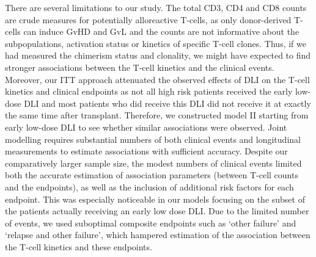 \documentclass[
  letterpaper,
  paper=240mm:170mm,
  twoside=true,
  open=right,
  fontsize=10pt,
  pagesize=false,
  BCOR=15mm,
  DIV=14,
  headinclude=true,
  footinclude=false,
  headsepline=on]{scrbook}
\begin{document}
There are several limitations to our study. The total CD3, CD4 and CD8
counts are crude measures for potentially alloreactive T-cells, as only
donor-derived T-cells can induce GvHD and GvL and the counts are not
informative about the subpopulations, activation status or kinetics of
specific T-cell clones. Thus, if we had measured the chimerism status
and clonality, we might have expected to find stronger associations
between the T-cell kinetics and the clinical events. Moreover, our ITT
approach attenuated the observed effects of DLI on the T-cell kinetics
and clinical endpoints as not all high risk patients received the early
low-dose DLI and most patients who did receive this DLI did not receive
it at exactly the same time after transplant. Therefore, we constructed
model II starting from early low-dose DLI to see whether similar
associations were observed. Joint modelling requires substantial numbers
of both clinical events and longitudinal measurements to estimate
associations with sufficient accuracy. Despite our comparatively larger
sample size, the modest numbers of clinical events limited both the
accurate estimation of association parameters (between T-cell counts and
the endpoints), as well as the inclusion of additional risk factors for
each endpoint. This was especially noticeable in our models focusing on
the subset of the patients actually receiving an early low dose DLI. Due
to the limited number of events, we used suboptimal composite endpoints
such as `other failure' and `relapse and other failure', which hampered
estimation of the association between the T-cell kinetics and these
endpoints.
\end{document}

